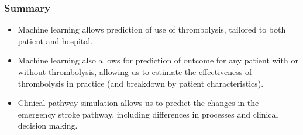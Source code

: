 
\begin{frame}
\frametitle{Summary}
\small

\begin{itemize}
    \item Machine learning allows prediction of use of thrombolysis, tailored to both patient and hospital.
    \item Machine learning also allows for prediction of outcome for any patient with or without thrombolysis, allowing us to estimate the effectiveness of thrombolysis in practice (and breakdown by patient characteristics).
    \item Clinical pathway simulation allows us to predict the changes in the emergency stroke pathway, including differences in processes and clinical decision making.
    

\end{itemize}

\end{frame}
